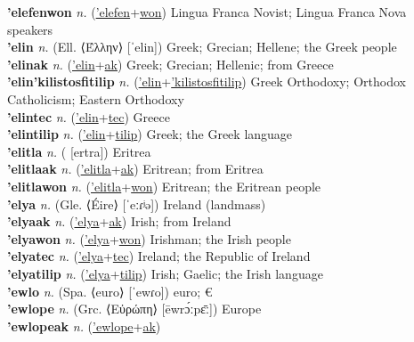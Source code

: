 \textbf{'elefenwon} \textit{n.} (\hyperref['elefen]{'elefen}+\hyperref[won]{won})
Lingua Franca Novist; Lingua Franca Nova speakers \label{'elefenwon} \\
\textbf{'elin} \textit{n.} (Ell. ⟨Έλλην⟩ [ˈelin])
Greek; Grecian; Hellene; the Greek people \label{'elin} \\
\textbf{'elinak} \textit{n.} (\hyperref['elin]{'elin}+\hyperref[ak]{ak})
Greek; Grecian; Hellenic; from Greece \label{'elinak} \\
\textbf{'elin'kilistosfitilip} \textit{n.} (\hyperref['elin]{'elin}+\hyperref['kilistosfitilip]{'kilistosfitilip})
Greek Orthodoxy; Orthodox Catholicism; Eastern Orthodoxy \label{'elin'kilistosfitilip} \\
\textbf{'elintec} \textit{n.} (\hyperref['elin]{'elin}+\hyperref[tec]{tec})
Greece \label{'elintec} \\
\textbf{'elintilip} \textit{n.} (\hyperref['elin]{'elin}+\hyperref[tilip]{tilip})
Greek; the Greek language \label{'elintilip} \\
\textbf{'elitla} \textit{n.} ( [ertra])
Eritrea \label{'elitla} \\
\textbf{'elitlaak} \textit{n.} (\hyperref['elitla]{'elitla}+\hyperref[ak]{ak})
Eritrean; from Eritrea \label{'elitlaak} \\
\textbf{'elitlawon} \textit{n.} (\hyperref['elitla]{'elitla}+\hyperref[won]{won})
Eritrean; the Eritrean people \label{'elitlawon} \\
\textbf{'elya} \textit{n.} (Gle. ⟨Éire⟩ [ˈeːɾʲə])
Ireland (landmass) \label{'elya} \\
\textbf{'elyaak} \textit{n.} (\hyperref['elya]{'elya}+\hyperref[ak]{ak})
Irish; from Ireland \label{'elyaak} \\
\textbf{'elyawon} \textit{n.} (\hyperref['elya]{'elya}+\hyperref[won]{won})
Irishman; the Irish people \label{'elyawon} \\
\textbf{'elyatec} \textit{n.} (\hyperref['elya]{'elya}+\hyperref[tec]{tec})
Ireland; the Republic of Ireland \label{'elyatec} \\
\textbf{'elyatilip} \textit{n.} (\hyperref['elya]{'elya}+\hyperref[tilip]{tilip})
Irish; Gaelic; the Irish language \label{'elyatilip} \\
\textbf{'ewlo} \textit{n.} (Spa. ⟨euro⟩ [ˈewɾo])
euro; € \label{'ewlo} \\
\textbf{'ewlope} \textit{n.} (Grc. ⟨Εὐρώπη⟩ [ēwrɔ́ːpɛ̄ː])
Europe \label{'ewlope} \\
\textbf{'ewlopeak} \textit{n.} (\hyperref['ewlope]{'ewlope}+\hyperref[ak]{ak})
